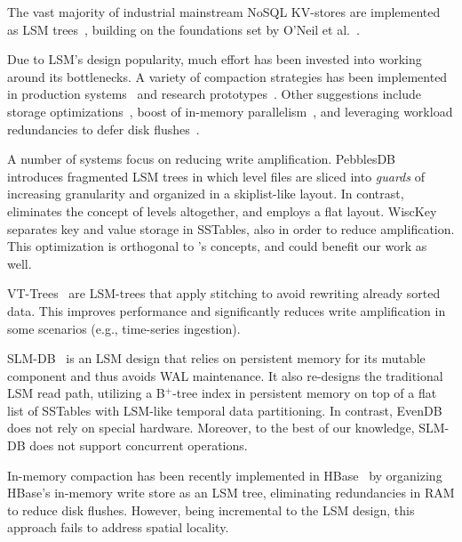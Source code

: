 

The vast majority of industrial mainstream NoSQL KV-stores are  implemented as LSM trees~\cite{hbase, 
RocksDB, scylladb, Bigtable2008, cassandra2010}, building on the foundations set by O'Neil 
et al.~\cite{DBLP:journals/acta/ONeilCGO96, Muth1998}. 

Due to LSM's design popularity, much effort has been invested into working around its bottlenecks.
A variety of compaction strategies has been implemented in production systems~\cite{CallaghanCompaction, 
ScyllaCompaction} and research prototypes~\cite{triad, PebblesDB, vttrees, slmdb}. Other suggestions include storage
optimizations~\cite{WiscKey, PebblesDB, vttrees, slmdb,Papagiannis:2018:EMK:3267809.3267824}, boost of in-memory parallelism~\cite{scylladb, clsm2015}, and leveraging 
 workload redundancies to defer disk flushes~\cite{triad, accordion}. 

A number of systems focus on reducing write amplification.
PebblesDB~\cite{PebblesDB} introduces fragmented LSM trees in which level files are 
sliced into {\em guards\/} of increasing granularity and organized in a skiplist-like layout. 
In contrast, \sys\/ eliminates the concept of levels altogether, 
and employs a flat  layout. WiscKey~\cite{WiscKey} separates key and value storage 
in SSTables, also in order to reduce amplification. This optimization is orthogonal to \sys's concepts,
and could benefit our work as well. 

VT-Trees~\cite{vttrees} are LSM-trees that apply stitching to avoid rewriting already sorted data. This improves performance and significantly reduces write amplification 
in some scenarios (e.g., time-series ingestion).

SLM-DB~\cite{slmdb} is an LSM design that relies on persistent memory for its mutable component and thus avoids WAL maintenance. It also re-designs the traditional LSM read path, utilizing a 
 B$^+$-tree index in persistent memory on top of a flat list of SSTables with LSM-like temporal data partitioning. In contrast, EvenDB does not rely on special hardware. 
 Moreover, to the best of our knowledge, SLM-DB does not support concurrent operations.

In-memory compaction has been recently implemented in HBase~\cite{accordion} by organizing
HBase's in-memory write store  as an LSM tree, eliminating redundancies 
in RAM to reduce disk flushes. However, being incremental to the LSM design, 
this approach fails to address spatial locality. 

